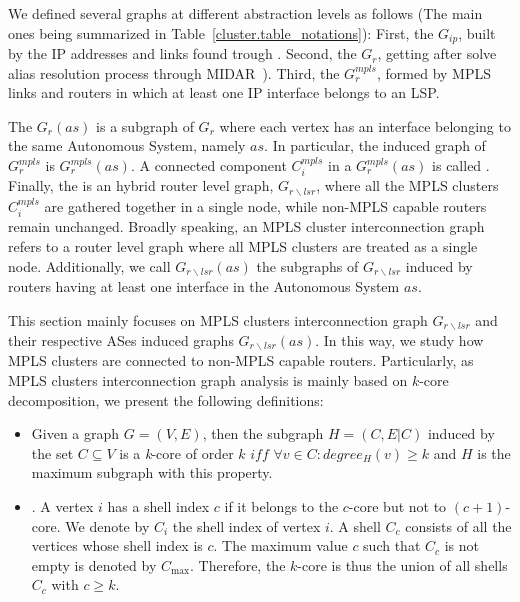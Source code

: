 We defined several graphs at different abstraction levels as follows (The main
ones being summarized in Table~\ref{cluster.table_notations}): First, the
 $G_{ip}$, built by the IP addresses and links found trough
\traceroute. Second, the  $G_{r}$, getting after solve
alias resolution process through MIDAR~\cite{Keys13}). Third, the  $G^{mpls}_{r}$, formed by MPLS links and routers in which at
least one IP interface belongs to an LSP.

The  $G_{r}(as)$ is a subgraph of $G_{r}$ where each
vertex has an interface belonging to the same Autonomous System, namely $as$.
In particular, the induced graph of $G_r^{mpls}$ is $G^{mpls}_{r}(as)$.
A connected component $C^{mpls}_{i}$ in a $G^{mpls}_{r}(as)$ is called . Finally, the  is an hybrid
router level graph,  $G_{r\backslash lsr}$, where all the MPLS clusters
$C^{mpls}_{i}$ are gathered together in a single node, while non-MPLS capable
routers remain unchanged. Broadly speaking, an MPLS cluster interconnection
graph refers to a router level graph where all MPLS clusters are treated as a
single node. Additionally, we call $G_{r\backslash lsr}(as)$ the subgraphs of
$G_{r\backslash lsr}$ induced by routers having at least one interface in the
Autonomous System $as$.

This section mainly focuses on MPLS clusters interconnection graph
$G_{r\backslash lsr}$ and their respective ASes induced graphs $G_{r\backslash
lsr}(as)$. In this way, we study how MPLS clusters are connected to non-MPLS
capable routers. Particularly, as MPLS clusters interconnection graph analysis
is mainly based on $k$-core decomposition, we  present the following
definitions:
\begin{itemize}
  \item{} Given a graph $G=(V,E)$, then the
  subgraph $H=(C,E|C)$ induced by the set $ C\subseteq V$ is a \textit{k}-core
  of order $k$ $iff$ $\forall v \in C: degree_{H}(v)\geq k$ and $H$ is the
  maximum subgraph with this property.      
  \item{}. A vertex $i$ has a shell index $c$ if it
  belongs to the $c$-core but not to $(c+1)$-core. We denote by $C_i$ the shell
  index of vertex $i$. A shell $C_c$ consists of all the vertices whose shell
  index is $c$. The maximum value $c$ such that $C_c$ is not empty is denoted by
  $C_{\max}$.  Therefore, the $k$-core is thus the union of all shells $C_c$ with
  $c \geq k$.
\end{itemize}

